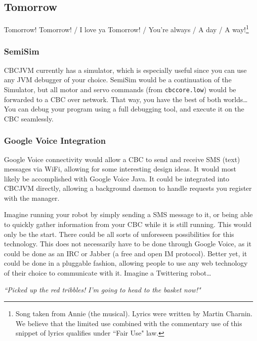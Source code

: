 \documentclass[12pt,letterpaper]{article}
\begin{document}
\subsection{Tomorrow}

Tomorrow! Tomorrow! / I love ya Tomorrow! / You're always / A day / A way!\footnote{Song taken from Annie (the musical). Lyrics were written by Martin Charnin. We believe that the limited use combined with the commentary use of this snippet of lyrics qualifies under ``Fair Use" law.}

\subsubsection{SemiSim}

CBCJVM currently has a simulator, which is especially useful since you can use any JVM debugger of your choice. SemiSim would be a continuation of the Simulator, but all motor and servo commands (from \texttt{cbccore.low}) would be forwarded to a CBC over network. That way, you have the best of both worlds\ldots You can debug your program using a full debugging tool, and execute it on the CBC seamlessly.



\subsubsection{Google Voice Integration}

Google Voice connectivity would allow a CBC to send and receive SMS (text) messages via WiFi, allowing for some interesting design ideas. It would most likely be accomplished with Google Voice Java. It could be integrated into CBCJVM directly, allowing a background daemon to handle requests you register with the manager.

Imagine running your robot by simply sending a SMS message to it, or being able to quickly gather information from your CBC while it is still running. This would only be the start. There could be all sorts of unforeseen possibilities for this technology. This does not necessarily have to be done through Google Voice, as it could be done as an IRC or Jabber (a free and open IM protocol). Better yet, it could be done in a pluggable fashion, allowing people to use any web technology of their choice to communicate with it. Imagine a Twittering robot\ldots

\textit{``Picked up the red tribbles! I'm going to head to the basket now!"}
\end{document}
